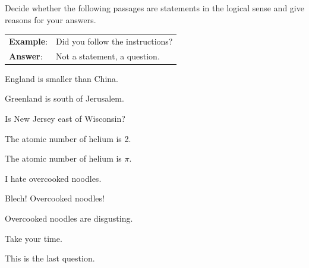\noindent\problempart Decide whether the following passages are statements in the logical sense and give reasons for your answers.

\begin{longtabu}{p{.1\linewidth}p{.9\linewidth}}
\textbf{Example}: & Did you follow the instructions? \\
\textbf{Answer}: & Not a statement, a question. \\
\end{longtabu}


\begin{exercises}
\item England is smaller than China. 
\item Greenland is south of Jerusalem. 
\item Is New Jersey east of Wisconsin? 
\item The atomic number of helium is 2. 
\item The atomic number of helium is $\pi$. 
\item I hate overcooked noodles. 
\item Blech! Overcooked noodles! 
\item Overcooked noodles are disgusting.
\item Take your time. 
\item This is the last question. 
\end{exercises}


